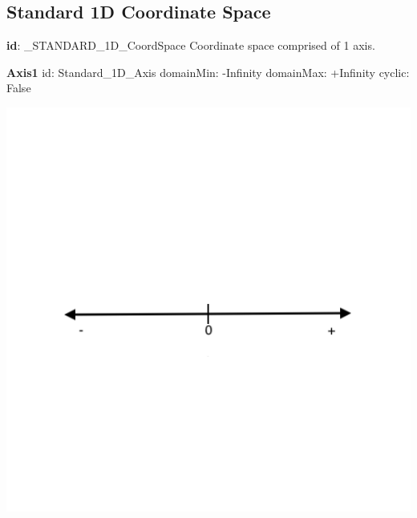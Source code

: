   \subsection{Standard 1D Coordinate Space}
  \label{sect:1DSpace}

  \vspace{-3cm}
  \begin{minipage}{0.5\textwidth}
    \small
    \textbf{id}: \_STANDARD\_1D\_CoordSpace \newline
    Coordinate space comprised of 1 axis.
    
    \noindent \textbf{Axis1} \newline
    \indent id:  Standard\_1D\_Axis \newline
    \indent domainMin:  -Infinity \newline
    \indent domainMax:  +Infinity \newline
    \indent cyclic:  False \newline
    
    \normalsize
  \end{minipage}
  \begin{minipage}{0.5\textwidth}
    \includegraphics{diagrams/Standard1DSpace.png}
  \end{minipage}

